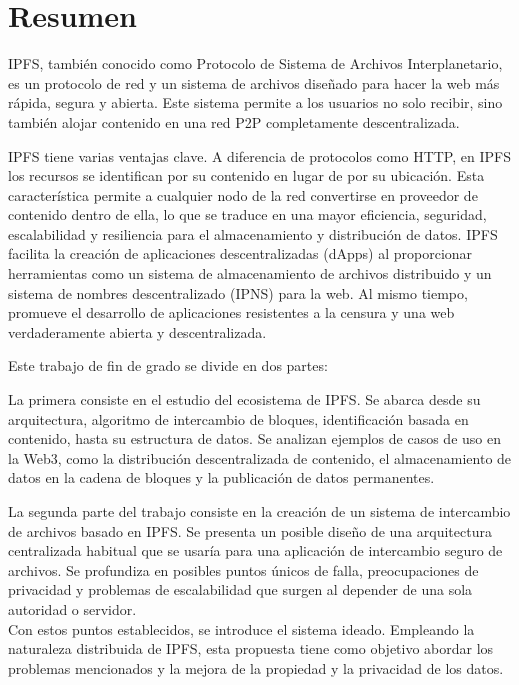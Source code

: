 \chapter*{Resumen}

IPFS, también conocido como Protocolo de Sistema de Archivos Interplanetario,
es un protocolo de red y un sistema de archivos diseñado para hacer
la web más rápida, segura y abierta. Este sistema permite a los usuarios no
solo recibir, sino también alojar contenido en una red P2P completamente descentralizada.

IPFS tiene varias ventajas clave. A diferencia de protocolos como HTTP, en IPFS los recursos se identifican
por su contenido en lugar de por su ubicación. Esta característica permite a cualquier nodo de la red
convertirse en proveedor de contenido dentro de ella, lo que se traduce en una mayor eficiencia, seguridad,
escalabilidad y resiliencia para el almacenamiento y distribución de datos.
IPFS facilita la creación de aplicaciones descentralizadas (dApps) al proporcionar herramientas como
un sistema de almacenamiento de archivos distribuido y un sistema de nombres descentralizado (IPNS) para la web. Al mismo tiempo, promueve el desarrollo de aplicaciones resistentes a la censura y una web verdaderamente abierta y descentralizada.

Este trabajo de fin de grado se divide en dos partes:

La primera consiste en el estudio del ecosistema de IPFS. Se abarca desde su arquitectura, algoritmo de intercambio de bloques,
identificación basada en contenido, hasta su estructura de datos. Se analizan ejemplos de casos de uso en la
Web3, como la distribución descentralizada de contenido, el almacenamiento de datos en la cadena de bloques y
la publicación de datos permanentes.

La segunda parte del trabajo consiste en la creación de un sistema de intercambio de archivos basado en IPFS.
Se presenta un posible diseño de una arquitectura centralizada habitual que se usaría para una aplicación de intercambio seguro de archivos.
Se profundiza en posibles puntos únicos de falla, preocupaciones de privacidad y problemas de escalabilidad que surgen al depender de una sola autoridad o servidor.
\\Con estos puntos establecidos, se introduce el sistema ideado. Empleando la naturaleza distribuida de IPFS, esta propuesta tiene como objetivo abordar los problemas mencionados y la mejora de la propiedad y la privacidad de los datos.

